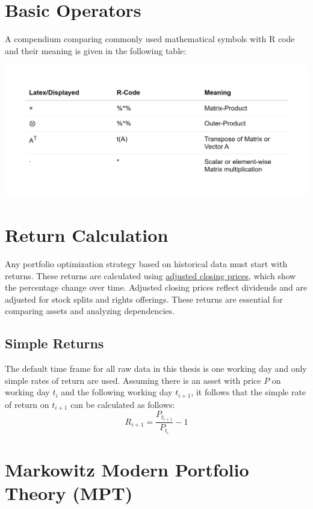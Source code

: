 \documentclass[
  oneside]{book}
\begin{document}
\hypertarget{basic-operators}{%
\section{Basic Operators}\label{basic-operators}}

A compendium comparing commonly used mathematical symbols with R code and their meaning is given in the following table:

\includegraphics{Master_Thesis_files/figure-latex/operators-1.png}

\hypertarget{return-calculation}{%
\section{Return Calculation}\label{return-calculation}}

Any portfolio optimization strategy based on historical data must start with returns. These returns are calculated using \href{https://www.investopedia.com/terms/a/adjusted\%20closingprice.asp}{adjusted closing prices}, which show the percentage change over time. Adjusted closing prices reflect dividends and are adjusted for stock splits and rights offerings. These returns are essential for comparing assets and analyzing dependencies.

\hypertarget{simple-returns}{%
\subsection{Simple Returns}\label{simple-returns}}

The default time frame for all raw data in this thesis is one working day and only simple rates of return are used. Assuming there is an asset with price \(P\) on working day \(t_i\) and the following working day \(t_{i+1}\), it follows that the simple rate of return on \(t_{i+1}\) can be calculated as follows:
\[
  R_{i+1} = \frac{P_{t_{i+1}}}{P_{t_i}}-1
\]

\hypertarget{markowitz-modern-portfolio-theory-mpt}{%
\section{Markowitz Modern Portfolio Theory (MPT)}\label{markowitz-modern-portfolio-theory-mpt}}
\end{document}
